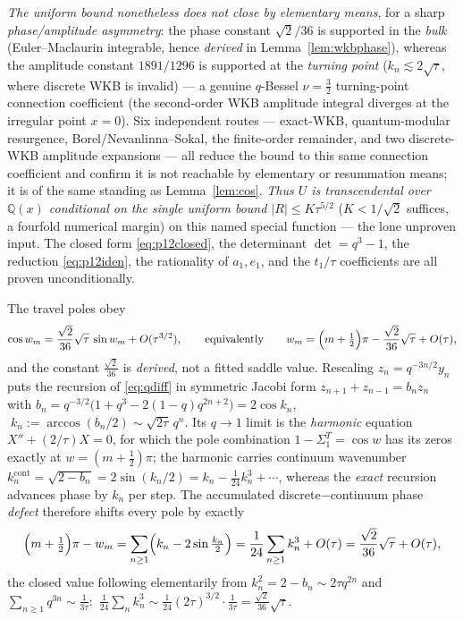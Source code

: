 \begin{remark}
\emph{The uniform bound nonetheless does not close by elementary means}, for a sharp \emph{phase/amplitude
asymmetry}: the phase constant $\sqrt2/36$ is supported in the \emph{bulk} (Euler--Maclaurin integrable, hence
\emph{derived} in Lemma~\ref{lem:wkbphase}), whereas the amplitude constant $1891/1296$ is supported at the
\emph{turning point} ($k_n\lesssim2\sqrt\tau$, where discrete WKB is invalid) --- a genuine $q$-Bessel
$\nu=\tfrac32$ turning-point connection coefficient (the second-order WKB amplitude integral diverges at the
irregular point $x=0$). Six independent routes --- exact-WKB, quantum-modular resurgence,
Borel/Nevanlinna--Sokal, the finite-order remainder, and two discrete-WKB amplitude expansions --- all reduce the
bound to this same connection coefficient and confirm it is not reachable by elementary or resummation means; it
is of the same standing as Lemma~\ref{lem:cos}. \emph{Thus $U$ is transcendental over $\mathbb Q(x)$ conditional
on the single uniform bound $|R|\le K\tau^{5/2}$} ($K<1/\sqrt2$ suffices, a fourfold numerical margin) on this
named special function --- the lone unproven input. The closed form \eqref{eq:p12closed}, the determinant
$\det=q^3-1$, the reduction \eqref{eq:p12iden}, the rationality of $a_1,e_1$, and the $t_1/\tau$ coefficients are
all proven unconditionally.
\end{remark}

\begin{lemma}\label{lem:wkbphase}
The travel poles obey
\begin{equation}\label{eq:polephase}
  \cos w_m=\frac{\sqrt2}{36}\sqrt\tau\,\sin w_m+O(\tau^{3/2}),
  \qquad\text{equivalently}\qquad
  w_m=\Bigl(m+\tfrac12\Bigr)\pi-\frac{\sqrt2}{36}\sqrt\tau+O(\tau),
\end{equation}
and the constant $\tfrac{\sqrt2}{36}$ is \emph{derived}, not a fitted saddle value. Rescaling
$z_n=q^{-3n/2}y_n$ puts the recursion of \eqref{eq:qdiff} in symmetric Jacobi form
$z_{n+1}+z_{n-1}=b_n z_n$ with
$b_n=q^{-3/2}\bigl(1+q^3-2(1-q)q^{2n+2}\bigr)=2\cos k_n$, $\;k_n:=\arccos(b_n/2)\sim\sqrt{2\tau}\,q^n$. Its
$q\to1$ limit is the \emph{harmonic} equation $X''+(2/\tau)X=0$, for which the pole combination
$1-\Sigma_1^T=\cos w$ has its zeros exactly at $w=(m+\tfrac12)\pi$; the harmonic carries continuum wavenumber
$k_n^{\mathrm{cont}}=\sqrt{2-b_n}=2\sin(k_n/2)=k_n-\tfrac1{24}k_n^3+\cdots$, whereas the \emph{exact}
recursion advances phase by $k_n$ per step. The accumulated discrete$-$continuum phase \emph{defect} therefore
shifts every pole by exactly
\begin{equation}\label{eq:wkbphase}
  \Bigl(m+\tfrac12\Bigr)\pi-w_m
  =\sum_{n\ge1}\Bigl(k_n-2\sin\tfrac{k_n}2\Bigr)
  =\frac1{24}\sum_{n\ge1}k_n^3+O(\tau)
  =\frac{\sqrt2}{36}\sqrt\tau+O(\tau),
\end{equation}
the closed value following elementarily from $k_n^2=2-b_n\sim2\tau q^{2n}$ and $\sum_{n\ge1}q^{3n}\sim
\tfrac1{3\tau}$:\ $\tfrac1{24}\sum_n k_n^3\sim\tfrac1{24}(2\tau)^{3/2}\!\cdot\!\tfrac1{3\tau}
=\tfrac{\sqrt2}{36}\sqrt\tau$.
\end{lemma}

